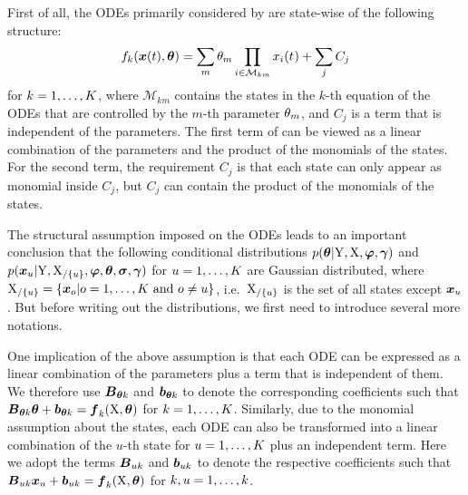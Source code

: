 First of all, the ODEs primarily considered by \cite{gorbach2017scalable} are state-wise of the following structure:
\begin{align}
    f_{k}(\boldsymbol{x}(t), \boldsymbol{\theta}) = \sum_m{\theta_{m}\prod_{i\in\mathcal{M}_{km}}{x_{i}(t_{})}} + \sum_j{C_j}
    \label{eq-vgmgp-odes}
\end{align}
for $k = 1,\dots,K$, where $\mathcal{M}_{km}$ contains the states in the $k$-th equation of the ODEs that are controlled by the $m$-th parameter $\theta_{m}$, and $C_j$ is a term that is independent of the parameters.
The first term of  can be viewed as a linear combination of the parameters and the product of the monomials of the states.
For the second term, the requirement $C_j$ is that each state can only appear as monomial inside $C_j$, but $C_j$ can contain the product of the monomials of the states.

The structural assumption imposed on the ODEs leads to an important conclusion that the  following conditional distributions $p(\boldsymbol{\theta}\vert\mathrm{Y},\mathrm{X},\boldsymbol{\varphi},\boldsymbol{\gamma})$ and $p(\boldsymbol{x}_{u}\vert\mathrm{Y},\mathrm{X}_{/\{u\}},\boldsymbol{\varphi},\boldsymbol{\theta},\boldsymbol{\sigma},\boldsymbol{\gamma})$ for $u = 1,\dots,K$ are Gaussian distributed, where $\mathrm{X}_{/\{u\}} = \{\boldsymbol{x}_{o}\vert o = 1,\dots,K\ \text{and}\ o \neq u \}$, i.e.\ $\mathrm{X}_{/\{u\}}$ is the set of all states except $\boldsymbol{x}_{u}$. 
But before writing out the distributions, we first need to introduce several more notations. 

One implication of the above assumption is that each ODE can be expressed as a linear combination of the parameters plus a term that is independent of them.
We therefore use $\boldsymbol{B}_{\boldsymbol{\theta}{k}}$ and $\boldsymbol{b}_{\boldsymbol{\theta}{k}}$ to denote the corresponding coefficients such that $\boldsymbol{B}_{\boldsymbol{\theta}{k}}\boldsymbol{\theta} + \boldsymbol{b}_{\boldsymbol{\theta}{k}} = \boldsymbol{f}_{k}(\mathrm{X}, \boldsymbol{\theta})$ for $k = 1,\dots,K$.
Similarly, due to the monomial assumption about the states, each ODE can also be transformed into a linear combination of the $u$-th state for $u = 1,\dots,K$ plus an independent term.
Here we adopt the terms $\boldsymbol{B}_{u{k}}$ and $\boldsymbol{b}_{u{k}}$ to denote the respective coefficients such that $\boldsymbol{B}_{u{k}}\boldsymbol{x}_{u} + \boldsymbol{b}_{u{k}} = \boldsymbol{f}_{k}(\mathrm{X}, \boldsymbol{\theta})$ for $k,u = 1,\dots,k$.

